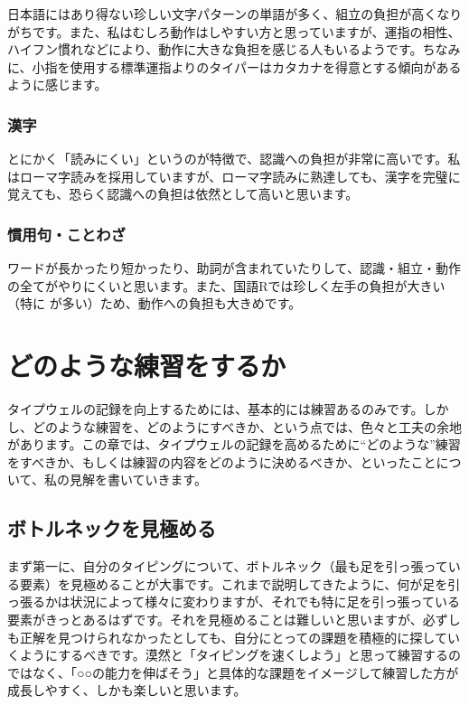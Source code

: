 日本語にはあり得ない珍しい文字パターンの単語が多く、組立の負担が高くなりがちです。また、私はむしろ動作はしやすい方と思っていますが、運指の相性、ハイフン慣れなどにより、動作に大きな負担を感じる人もいるようです。ちなみに、小指を使用する標準運指よりのタイパーはカタカナを得意とする傾向があるように感じます。

\subsubsection*{漢字}

とにかく「読みにくい」というのが特徴で、認識への負担が非常に高いです。私はローマ字読みを採用していますが、ローマ字読みに熟達しても、漢字を完璧に覚えても、恐らく認識への負担は依然として高いと思います。

\subsubsection*{慣用句・ことわざ}

ワードが長かったり短かったり、助詞が含まれていたりして、認識・組立・動作の全てがやりにくいと思います。また、国語Rでは珍しく左手の負担が大きい（特に が多い）ため、動作への負担も大きめです。

\section{どのような練習をするか}

タイプウェルの記録を向上するためには、基本的には練習あるのみです。しかし、どのような練習を、どのようにすべきか、という点では、色々と工夫の余地があります。この章では、タイプウェルの記録を高めるために“どのような”練習をすべきか、もしくは練習の内容をどのように決めるべきか、といったことについて、私の見解を書いていきます。

\subsection{ボトルネックを見極める}

まず第一に、自分のタイピングについて、ボトルネック（最も足を引っ張っている要素）を見極めることが大事です。これまで説明してきたように、何が足を引っ張るかは状況によって様々に変わりますが、それでも特に足を引っ張っている要素がきっとあるはずです。それを見極めることは難しいと思いますが、必ずしも正解を見つけられなかったとしても、自分にとっての課題を積極的に探していくようにするべきです。漠然と「タイピングを速くしよう」と思って練習するのではなく、「○○の能力を伸ばそう」と具体的な課題をイメージして練習した方が成長しやすく、しかも楽しいと思います。

